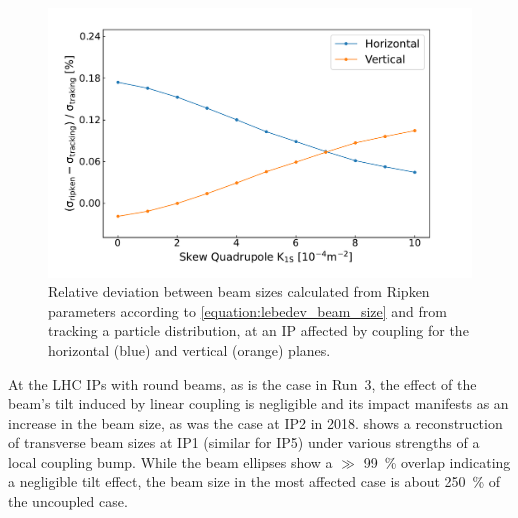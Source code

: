\begin{figure}[!htb]
    \centering
    \includegraphics*[width=0.99\columnwidth]{Figures/IR_Coupling_Correction/lebedev_vs_tracking.pdf}
    \caption{Relative deviation between beam sizes calculated from Ripken parameters according to \cref{equation:lebedev_beam_size} and from tracking a particle distribution, at an IP affected by coupling for the horizontal (\textcolor{mplblue}{blue}) and vertical (\textcolor{mplorange}{orange}) planes.}
    \label{figure:lebedev_vs_tracking}
\end{figure}

At the LHC IPs with round beams, as is the case in Run~\num{3}, the effect of the beam's tilt induced by linear coupling is negligible and its impact manifests as an increase in the beam size, as was the case at IP\num{2} in \num{2018}.
 shows a reconstruction of transverse beam sizes at IP\num{1} (similar for IP\num{5}) under various strengths of a local coupling bump.
While the beam ellipses show a \(\gg\) \qty{99}{\percent} overlap indicating a negligible tilt effect, the beam size in the most affected case is about \qty{250}{\percent} of the uncoupled case.

